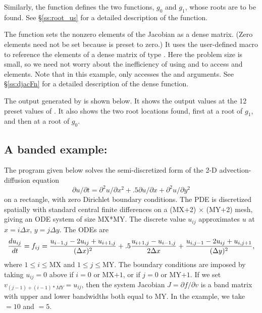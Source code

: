 Similarly, the function  defines the two functions, $g_0$ and $g_1$,
whose roots are to be found.  See \S\ref{ss:root_us} for a detailed description
of the  function.

The function  sets the nonzero elements of the Jacobian as a
dense matrix.  (Zero elements need not be set because  is preset
to zero.)  It uses the user-defined macro  to reference the
elements of a dense matrix of type .  Here the problem
size is small, so we need not worry about the inefficiency of using
 and  to access  and
 elements.  Note that in this example, 
only accesses the  and  arguments.  See \S\ref{ss:djacFn}
for a detailed description of the dense  function.

The output generated by  is shown below.  It shows the output
values at the 12 preset values of .  It also shows the two root
locations found, first at a root of $g_1$, and then at a root of $g_0$.


\subsection{A banded example: }\label{ss:cvbx}

The  program given below solves the semi-discretized form
of the 2-D advection-diffusion equation
\begin{equation}
\label{eq:adeqn}
\partial u / \partial t = \partial^2 u / \partial x^2
  + .5 \partial u / \partial x + \partial^2 u / \partial y^2
\end{equation}
on a rectangle, with zero Dirichlet boundary conditions. The PDE is 
discretized spatially with standard central finite differences 
on a (MX+2) $\times$ (MY+2) mesh, giving an ODE system of size MX*MY.  
The discrete value $u_{ij}$ approximates $u$ at $x = i \Delta x$,
$y = j \Delta y$. The ODEs are
\begin{equation}
\label{eq:cdiff}
{{du_{ij}} \over dt} = f_{ij} =
         {{u_{i-1,j} - 2 u_{ij} + u_{i+1,j}} \over {(\Delta x)^2}}
       + .5  {{u_{i+1,j} - u_{i-1,j}} \over {2 \Delta x}}
       + {{u_{i,j-1} - 2 u_{ij} + u_{i,j+1}} \over {(\Delta y)^2}},
\end{equation}
where $1 \leq i \leq $MX and $1 \leq j \leq $MY.  The boundary
conditions are imposed by taking $u_{ij} = 0$ above if $i = 0$
or MX$+1$, or if $j = 0$ or MY$+1$. 
If we set $v_{(j-1)+(i-1)*MY} = u_{ij}$, then the system Jacobian
$J = \partial f / \partial v$ is a band matrix with upper and lower
bandwidths both equal to MY.  In the example, we take  $= 10$ and
 $= 5$.

